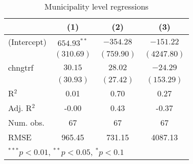 
\begin{table}
\caption{Municipality level regressions}
\begin{center}
\begin{tabular}{l c c c }
\hline
 & (1) & (2) & (3) \\
\hline
(Intercept) & $654.93^{**}$ & $-354.28$  & $-151.22$   \\
            & $(310.69)$    & $(759.90)$ & $(4247.80)$ \\
chngtrf     & $30.15$       & $28.02$    & $-24.29$    \\
            & $(30.93)$     & $(27.42)$  & $(153.29)$  \\
\hline
R$^2$       & 0.01          & 0.70       & 0.27        \\
Adj. R$^2$  & -0.00         & 0.43       & -0.37       \\
Num. obs.   & 67            & 67         & 67          \\
RMSE        & 965.45        & 731.15     & 4087.13     \\
\hline
\multicolumn{4}{l}{\scriptsize{$^{***}p<0.01$, $^{**}p<0.05$, $^*p<0.1$}}
\end{tabular}
\label{table:coefficients}
\end{center}
\end{table}
